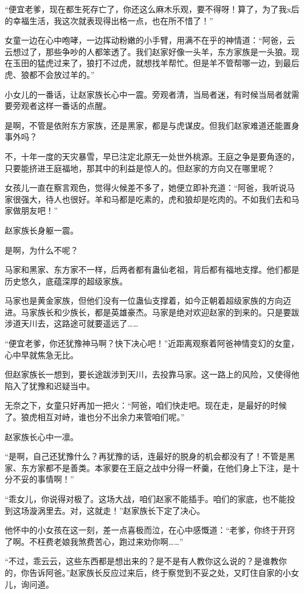 \begin{this_body}
“便宜老爹，现在都生死存亡了，你还这么麻木乐观，要不得呀！算了，为了我x后的幸福生活，我这次就表现得出格一点，也在所不惜了！”

女童一边在心中咆哮，一边挥动粉嫩的小手臂，用满不在乎的神情道：“阿爸，云云想过了，那些争吵的人都笨透了。我们赵家好像一头羊，东方家族是一头狼。现在玉田的猛虎过来了，狼打不过虎，就想找羊帮忙。但是羊不管帮哪一边，到最后虎、狼都不会放过羊的。”

小女儿的一番话，让赵家族长心中一震。旁观者清，当局者迷，有时候当局者就需要旁观者这样一番话的点醒。

是啊，不管是依附东方家族，还是黑家，都是与虎谋皮。但我们赵家难道还能置身事外吗？

不，十年一度的天灾暴雪，早已注定北原无一处世外桃源。王庭之争是要角逐的，只要能挤进王庭福地，那其中的利益是惊人的。但赵家的方向又在哪里呢？

女孩儿一直在察言观色，觉得火候差不多了，她便立即补充道：“阿爸，我听说马家很强大，待人也很好。羊和马都是吃素的，虎和狼却是吃肉的。不如我们去和马家做朋友吧！”

赵家族长身躯一震。

是啊，为什么不呢？

马家和黑家、东方家不一样，后两者都有蛊仙老祖，背后都有福地支撑。他们都是历史悠久，底蕴深厚的超级家族。

马家也是黄金家族，但他们没有一位蛊仙支撑着，如今正朝着超级家族的方向迈进。马家族长和少族长，都是英雄豪杰。马家是绝对欢迎赵家的到来的。只是要跋涉道天川去，这路途可就要遥远了……

“便宜老爹，你还犹豫神马啊？快下决心吧！”近距离观察着阿爸神情变幻的女童，心中早就焦急无比。

但赵家族长一想到，要长途跋涉到天川，去投靠马家。这一路上的风险，又使得他陷入了犹豫和迟疑当中。

无奈之下，女童只好再加一把火：“阿爸，咱们快走吧。现在走，是最好的时候了。狼虎相互对峙，谁也分不出余力来管咱们呢。”

赵家族长心中一凛。

“是啊，自己还犹豫什么？再犹豫的话，连最好的脱身的机会都没有了！不管是黑家、东方家都不是善类。本家要在王庭之战中分得一杯羹，在他们身上下注，是十分不妥的事情啊！”

“乖女儿，你说得对极了。这场大战，咱们赵家不能插手。咱们的家底，也不能投到这场漩涡里去。对，这就走！”赵家族长下定了决心。

他怀中的小女孩在这一刻，差一点喜极而泣，在心中感慨道：“老爹，你终于开窍了啊。不枉费老娘我煞费苦心，跑过来劝你啊……”

“不过，乖云云，这些东西都是想出来的？是不是有人教你这么说的？是谁教你的，你告诉阿爸。”赵家族长反应过来后，终于察觉到不妥之处，又盯住自家的小女儿，询问道。


\end{this_body}
